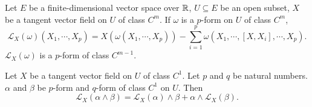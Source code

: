 \begin{notationenv}
    Let $E$ be a finite-dimensional vector space over $\mathbb{R}$, $U \subseteq E$ be an open subset,
    $X$ be a tangent vector field on $U$ of class $C^m$.
    If $\omega$ is a $p$-form on $U$ of class $C^m$, 
    $$\mathcal{L}_{X}(\omega)(X_1,\cdots,X_p) = X\left(\omega(X_1,\cdots,X_p)\right) - \sum_{i=1}^{p} \omega(X_1,\cdots,[X,X_i],\cdots,X_p).$$
    $\mathcal{L}_{X}(\omega)$ is a $p$-form of class $C^{m-1}$.
\end{notationenv}

\begin{propositionenv}
    Let $X$ be a tangent vector field on $U$ of class $C^1$.
    Let $p$ and $q$ be natural numbers.
    $\alpha$ and $\beta$ be $p$-form and $q$-form of class $C^1$ on $U$.
    Then 
    $$\mathcal{L}_{X}(\alpha \wedge \beta) = \mathcal{L}_{X}(\alpha) \wedge \beta + \alpha \wedge \mathcal{L}_{X}(\beta).$$
\end{propositionenv}
